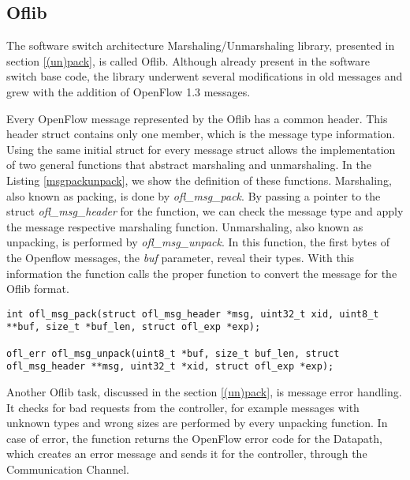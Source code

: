 \subsection{Oflib}
\label{sec:sec41}

The software switch architecture Marshaling/Unmarshaling library, presented in section \ref{(un)pack}, is called Oflib. Although already present in the software switch base code, the library underwent several modifications in old messages and grew with the addition of OpenFlow 1.3 messages.

Every OpenFlow message represented by the Oflib has a common header. This header struct contains only one member, which is the message type information. Using the same initial struct for every message struct allows the implementation of two general functions that abstract marshaling and unmarshaling. In the Listing \ref{msgpackunpack}, we show the definition of these functions. Marshaling, also known as packing, is done by \textit{ofl_msg_pack}. By passing a pointer to the struct \textit{ofl_msg_header} for the function, we can check the message type and apply the message respective marshaling function. Unmarshaling, also known as unpacking, is performed by \textit{ofl_msg_unpack}. In this function, the first bytes of the Openflow messages, the \textit{buf} parameter, reveal their types. With this information the function calls the proper function to convert the message for the Oflib format.  
\begin{lstlisting}[caption={Oflib: message pack and unpack base functions}, label=msgpackunpack,]
int ofl_msg_pack(struct ofl_msg_header *msg, uint32_t xid, uint8_t **buf, size_t *buf_len, struct ofl_exp *exp);

ofl_err ofl_msg_unpack(uint8_t *buf, size_t buf_len, struct ofl_msg_header **msg, uint32_t *xid, struct ofl_exp *exp);
\end{lstlisting}

Another Oflib task, discussed in the section \ref{(un)pack}, is message error handling. It checks for bad requests from the controller, for example messages with unknown types and wrong sizes are performed by every unpacking function. In case of error, the function returns the OpenFlow error code for the Datapath, which creates an error message and sends it for the controller, through the Communication Channel.

